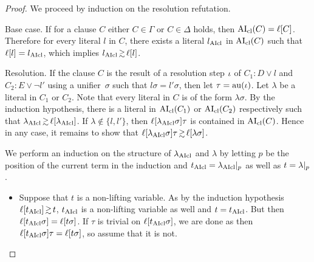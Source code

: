 \documentclass[,%
	draft=false,%
	numbers=noendperiod
	11pt,
	a4paper,
	oneside,%
	openany,
]{memoir}
\begin{document}
\begin{proof}
	We proceed by induction on the resolution refutation.
	\begin{description}
		\item{Base case.}
			If for a clause $C$ either $C\in \Gamma$ or $C \in \Delta$ holds, then $\operatorname{AI}_\mathrm{cl}(C) = \ell[C]$.
			Therefore for every literal $l$ in $C$, there exists a literal $l_{\operatorname{AIcl}}$ in $\operatorname{AI}_\mathrm{cl}(C)$ such that $\ell[l] = l_{\operatorname{AIcl}}$, which implies $l\cl \simgeq \lifboth{l}$.

		\item{Resolution.}
			If the clause $C$ is the result of a resolution step $\iota$ of $C_1: D \lor l$ and $C_2: E \lor \lnot l'$ using a unifier~$\sigma$ such that $l\sigma = l'\sigma$,
			then let $\tau = \operatorname{au}(\iota)$.
			Let $\lambda$ be a literal in $C_1$ or $C_2$.
			Note that every literal in $C$ is of the form $\lambda\sigma$.
			By the induction hypothesis, there is a literal in $\operatorname{AI}_\mathrm{cl}(C_1)$ or $\operatorname{AI}_\mathrm{cl}(C_2)$ respectively such that $\lambda\cl \simgeq \lifboth{\lambda\cl}$.
			If $\lambda \not\in\{l,l'\}$, then $\ell[\lambda_{\operatorname{AIcl}}\sigma]\tau$ is contained in $\operatorname{AI}_\mathrm{cl}(C)$.
			Hence in any case, it remains to show that $\lifboth{\lambda\cl\sigma}\tau \simgeq \lifboth{\lambda\sigma}$.




			We perform an induction on the structure of $\lambda_{\operatorname{AIcl}}$ and $\lambda$
			by letting $p$ be the position of the current term in the induction and $t_{\operatorname{AIcl}} = \lambda_{\operatorname{AIcl}}|_{p}$ as well as $t=\lambda|_{p}$.
			\begin{itemize}
				\item
					Suppose that $t$ is a non-lifting variable.
					As by the induction hypothesis $\lifboth{t\cl} \simgeq t$, $t_{\operatorname{AIcl}}$ is a non-lifting variable as well and $t = t_{\operatorname{AIcl}}$.
					But then $\ell[t_{\operatorname{AIcl}}\sigma] = \ell[t\sigma]$.
					If $\tau$ is trivial on $\ell[t_{\operatorname{AIcl}}\sigma]$, we are done as then $\ell[t_{\operatorname{AIcl}}\sigma]\tau = \ell[t\sigma]$, so assume that it is not.


\end{itemize}
\end{description}
\end{proof}
\end{document}
